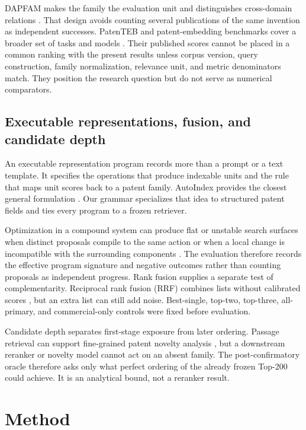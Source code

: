 \documentclass[final,5p,times,twocolumn]{elsarticle}
\begin{document}
DAPFAM makes the family the evaluation unit and distinguishes cross-domain
relations \cite{dapfam2026}. That design avoids counting several publications
of the same invention as independent successes. PatenTEB and patent-embedding
benchmarks cover a broader set of tasks and models
\cite{patenteb2025,patentembeddings2026}. Their published scores cannot be
placed in a common ranking with the present results unless corpus version,
query construction, family normalization, relevance unit, and metric
denominators match. They position the research question but do not serve as
numerical comparators.

\subsection{Executable representations, fusion, and candidate depth}

An executable representation program records more than a prompt or a text
template. It specifies the operations that produce indexable units and the
rule that maps unit scores back to a patent family. AutoIndex provides the
closest general formulation \cite{autoindex2026}. Our grammar specializes
that idea to structured patent fields and ties every program to a frozen
retriever.

Optimization in a compound system can produce flat or unstable search
surfaces when distinct proposals compile to the same action or when a local
change is incompatible with the surrounding components
\cite{promptcoinflip2026}. The evaluation therefore records the effective
program signature and negative outcomes rather than counting proposals as
independent progress.
Rank fusion supplies a separate test of complementarity. Reciprocal rank
fusion (RRF) combines lists without calibrated scores \cite{rrf2009}, but an
extra list can still add noise. Best-single, top-two, top-three, all-primary,
and commercial-only controls were fixed before evaluation.

Candidate depth separates first-stage exposure from later ordering. Passage
retrieval can support fine-grained patent novelty analysis
\cite{finepatents2026}, but a downstream reranker or novelty model cannot act
on an absent family. The post-confirmatory oracle therefore asks only what
perfect ordering of the already frozen Top-200 could achieve. It is an
analytical bound, not a reranker result.

\section{Method}
\end{document}
